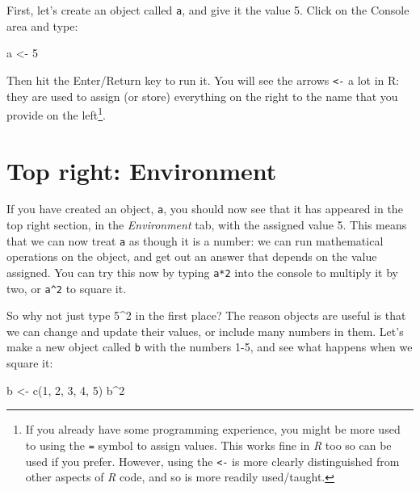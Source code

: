 \documentclass[
  a4paper,
  DIV=11,
  numbers=noendperiod]{scrreprt}
\newenvironment{Shaded}{\begin{snugshade}}{\end{snugshade}}
\newcommand{\DecValTok}[1]{\textcolor[rgb]{0.68,0.00,0.00}{#1}}
\newcommand{\FunctionTok}[1]{\textcolor[rgb]{0.28,0.35,0.67}{#1}}
\newcommand{\NormalTok}[1]{\textcolor[rgb]{0.00,0.23,0.31}{#1}}
\newcommand{\OtherTok}[1]{\textcolor[rgb]{0.00,0.23,0.31}{#1}}
\newcommand{\SpecialCharTok}[1]{\textcolor[rgb]{0.37,0.37,0.37}{#1}}
\begin{document}
First, let's create an object called \texttt{a}, and give it the value
5. Click on the Console area and type:

\begin{Shaded}
\begin{Highlighting}[]
\NormalTok{a }\OtherTok{\textless{}{-}} \DecValTok{5}
\end{Highlighting}
\end{Shaded}

Then hit the Enter/Return key to run it. You will see the arrows
\texttt{\textless{}-} a lot in R: they are used to assign (or store)
everything on the right to the name that you provide on the
left\footnote{If you already have some programming experience, you might
  be more used to using the \texttt{=} symbol to assign values. This
  works fine in \emph{R} too so can be used if you prefer. However,
  using the \texttt{\textless{}-} is more clearly distinguished from
  other aspects of \emph{R} code, and so is more readily used/taught.}.

\section{Top right: Environment}\label{top-right-environment}

If you have created an object, \texttt{a}, you should now see that it
has appeared in the top right section, in the \emph{Environment} tab,
with the assigned value 5. This means that we can now treat \texttt{a}
as though it is a number: we can run mathematical operations on the
object, and get out an answer that depends on the value assigned. You
can try this now by typing \texttt{a*2} into the console to multiply it
by two, or \texttt{a\^{}2} to square it.

So why not just type 5\^{}2 in the first place? The reason objects are
useful is that we can change and update their values, or include many
numbers in them. Let's make a new object called \texttt{b} with the
numbers 1-5, and see what happens when we square it:

\begin{Shaded}
\begin{Highlighting}[]
\NormalTok{b }\OtherTok{\textless{}{-}} \FunctionTok{c}\NormalTok{(}\DecValTok{1}\NormalTok{, }\DecValTok{2}\NormalTok{, }\DecValTok{3}\NormalTok{, }\DecValTok{4}\NormalTok{, }\DecValTok{5}\NormalTok{)}
\NormalTok{b}\SpecialCharTok{\^{}}\DecValTok{2}
\end{Highlighting}
\end{Shaded}
\end{document}
